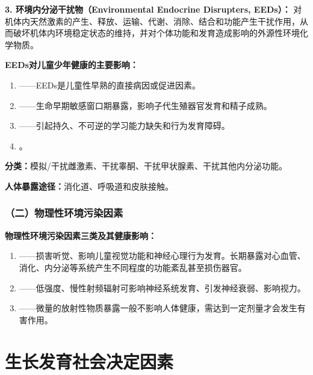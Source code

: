 \begin{keybox}
\textbf{3. 环境内分泌干扰物（Environmental Endocrine Disrupters, EEDs）：}
对机体内天然激素的产生、释放、运输、代谢、消除、结合和功能产生干扰作用，从而破坏机体内环境稳定状态的维持，并对个体功能和发育造成影响的外源性环境化学物质。

\textbf{EEDs对儿童少年健康的主要影响：}
\begin{enumerate}[leftmargin=*]
    \item {}——EEDs是儿童性早熟的直接病因或促进因素。
    \item {}——生命早期敏感窗口期暴露，影响子代生殖器官发育和精子成熟。
    \item {}——引起持久、不可逆的学习能力缺失和行为发育障碍。
    \item {}。
\end{enumerate}

\textbf{分类：}模拟/干扰雌激素、干扰睾酮、干扰甲状腺素、干扰其他内分泌功能。

\textbf{人体暴露途径：}消化道、呼吸道和皮肤接触。
\end{keybox}

\subsubsection{（二）物理性环境污染因素}

\begin{keybox}
\textbf{物理性环境污染因素三类及其健康影响：}

\begin{enumerate}[leftmargin=*]
    \item {}——损害听觉、影响儿童视觉功能和神经心理行为发育。长期暴露对心血管、消化、内分泌等系统产生不同程度的功能紊乱甚至损伤器官。
    \item {}——低强度、慢性射频辐射可影响神经系统发育、引发神经衰弱、影响视力。
    \item {}——微量的放射性物质暴露一般不影响人体健康，需达到一定剂量才会发生有害作用。
\end{enumerate}
\end{keybox}

\section{生长发育社会决定因素}

